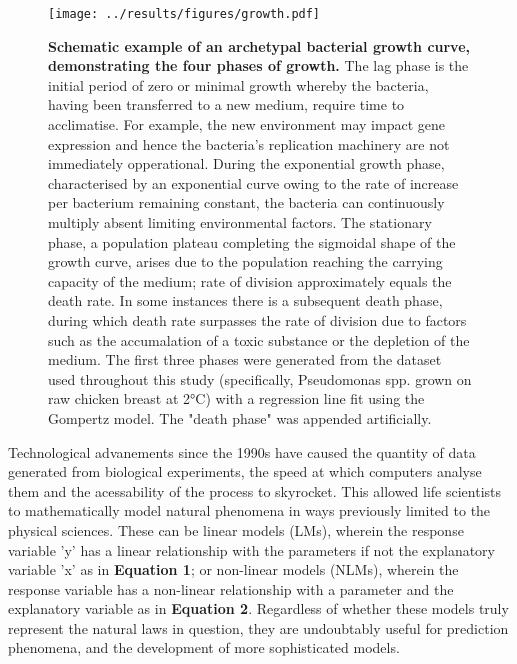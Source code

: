 \documentclass[11pt]{article}
\begin{document}
\vspace{5mm}
\begin{figure}[htb]
    \centering
    \texttt{[image: ../results/figures/growth.pdf]}
    \caption{\textbf{Schematic example of an archetypal bacterial growth curve, demonstrating the four phases of growth.}  The lag phase is the initial period of zero or minimal growth whereby the bacteria, having been transferred to a new medium, require time to acclimatise. For example, the new environment may impact gene expression and hence the bacteria's replication machinery are not immediately opperational.\parencite{Buchanan1918} During the exponential growth phase, characterised by an exponential curve owing to the rate of increase per bacterium remaining constant, the bacteria can continuously multiply absent limiting environmental factors.\parencite{Micha2011} The stationary phase, a population plateau completing the sigmoidal shape of the growth curve, arises due to the population reaching the carrying capacity of the medium; rate of division approximately equals the death rate.\parencite{Buchanan1918} In some instances there is a subsequent death phase, during which death rate surpasses the rate of division due to factors such as the accumalation of a toxic substance or the depletion of the medium.\parencite{Micha2011, Buchanan1918}
    The first three phases were generated from the dataset used throughout this study (specifically, Pseudomonas spp. grown on raw chicken breast at 2°C) with a regression line fit using the Gompertz model. The "death phase" was appended artificially.}
\end{figure}
\vspace{5mm}

Technological advanements since the 1990s have caused the quantity of data generated from biological experiments, the speed at which computers analyse them and the acessability of the process to skyrocket. This allowed life scientists to mathematically model natural phenomena in ways previously limited to the physical sciences.\parencite{Bolker2013,Johnson2004} These can be linear models (LMs), wherein the response variable 'y' has a linear relationship with the parameters if not the explanatory variable 'x' as in \textbf{Equation 1}; or non-linear models (NLMs), wherein the response variable has a non-linear relationship with a parameter and the explanatory variable as in \textbf{Equation 2}.\parencite{Bolker2013} Regardless of whether these models truly represent the natural laws in question, they are undoubtably useful for prediction phenomena, and the development of more sophisticated models.\parencite{Transtrum2016}
\end{document}
